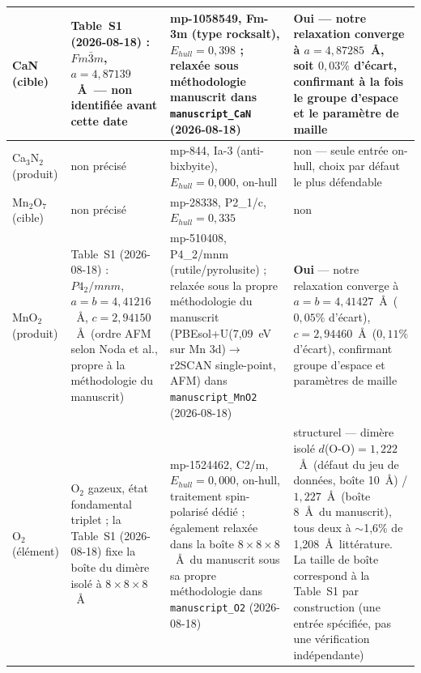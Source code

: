 \begin{longtable}{@{}p{2.6cm} p{3.0cm} p{3.6cm} p{5.2cm}@{}}
\midrule
CaN (cible) & Table~S1 (2026-08-18) : $Fm\bar{3}m$, $a=4{,}87139$~\AA\ --- non identifiée avant cette date & mp-1058549, Fm-3m (type rocksalt), $E_{hull}=0{,}398$ ; relaxée sous méthodologie manuscrit dans \texttt{manuscript\_CaN} (2026-08-18) & \textbf{Oui} --- notre relaxation converge à $a=4{,}87285$~\AA, soit $0{,}03\%$ d'écart, confirmant à la fois le groupe d'espace et le paramètre de maille \\
\midrule
Ca$_3$N$_2$ (produit) & non précisé & mp-844, Ia-3 (anti-bixbyite), $E_{hull}=0{,}000$, on-hull & non --- seule entrée on-hull, choix par défaut le plus défendable \\
\midrule
Mn$_2$O$_7$ (cible) & non précisé & mp-28338, P2\_1/c, $E_{hull}=0{,}335$ & non \\
\midrule
MnO$_2$ (produit) & Table~S1 (2026-08-18) : $P4_2/mnm$, $a=b=4{,}41216$~\AA, $c=2{,}94150$~\AA\ (ordre AFM selon Noda et al., propre à la méthodologie du manuscrit) & mp-510408, P4\_2/mnm (rutile/pyrolusite) ; relaxée sous la propre méthodologie du manuscrit (PBEsol+U(7,09~eV sur Mn 3d)$\to$r2SCAN single-point, AFM) dans \texttt{manuscript\_MnO2} (2026-08-18) & \textbf{Oui} --- notre relaxation converge à $a=b=4{,}41427$~\AA\ ($0{,}05\%$ d'écart), $c=2{,}94460$~\AA\ ($0{,}11\%$ d'écart), confirmant groupe d'espace et paramètres de maille \\
\midrule
O$_2$ (élément) & O$_2$ gazeux, état fondamental triplet ; la Table~S1 (2026-08-18) fixe la boîte du dimère isolé à $8\times8\times8$~\AA & mp-1524462, C2/m, $E_{hull}=0{,}000$, on-hull, traitement spin-polarisé dédié ; également relaxée dans la boîte $8\times8\times8$~\AA\ du manuscrit sous sa propre méthodologie dans \texttt{manuscript\_O2} (2026-08-18) & structurel --- dimère isolé $d$(O-O)$=1{,}222$~\AA\ (défaut du jeu de données, boîte 10~\AA) / $1{,}227$~\AA\ (boîte 8~\AA\ du manuscrit), tous deux à $\sim$1,6\% de 1,208~\AA\ littérature. La taille de boîte correspond à la Table~S1 par construction (une entrée spécifiée, pas une vérification indépendante) \\
\end{longtable}

